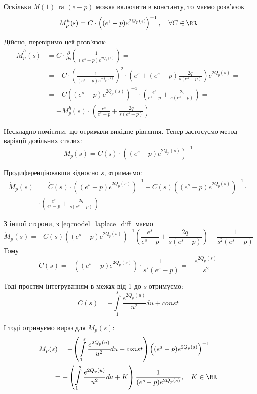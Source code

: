 Оскільки $M(1)$ та $(e-p)$ можна включити в константу, то маємо розв'язок
\begin{equation}
\label{eq:model_laplace_homogen_sol}
M_{p}^{h} (s) = C \cdot \left((e^s - p)  e^{2Q_p(s)}\right)^{-1}, \quad \forall C \in \RR
\end{equation}

Дійсно, перевіримо цей розв'язок:
\[
\begin{split}
\dot M_{p}^{h} (s) &= C \cdot \frac{\partial}{\partial s} \left(\frac{1}{(e^s - p)  e^{2Q_p(s)}}\right)=\\
&= - C \cdot \left(\frac{1}{(e^s - p)  e^{2Q_p(s)}}\right)^2 \cdot \left(e^s  + (e^s - p) \frac{2q}{s(e^s - p)}   \right) e^{2Q_p(s)} =\\
&= -C \left((e^s - p)  e^{2Q_p(s)}\right)^{-1} \cdot \left(\frac{e^s}{e^s - p}  + \frac{2q}{s(e^s - p)}   \right) =\\
&= - M_{p}^{h}(s) \cdot \left(\frac{e^s}{e^s - p}  + \frac{2q}{s(e^s - p)}   \right)
\end{split}
\]

Нескладно помітити, що отримали вихідне рівняння. Тепер застосуємо метод варіації довільних сталих:
$$
M_{p}(s) = C(s) \cdot \left((e^s - p)  e^{2Q_p(s)}\right)^{-1} 
$$

Продиференціювавши відносно $s$, отримаємо:
\begin{align*}
\dot M_{p}(s) &= \dot C(s) \cdot \left((e^s - p)  e^{2Q_p(s)}\right)^{-1} -C(s) \left((e^s - p)  e^{2Q_p(s)}\right)^{-1} \cdot \\
&\cdot \left(\frac{e^s}{e^s - p}  + \frac{2q}{s(e^s - p)}   \right) 
\end{align*}

З іншої сторони, з \eqref{eq:model_laplace_diff} маємо
$$
\dot M_{p}(s) = - C(s) \left((e^s - p)  e^{2Q_p(s)}\right)^{-1}  \left(\frac{e^s}{e^s - p} + \frac{2q}{s(e^s - p)}\right) - \frac{1}{s^2(e^s - p)} \quad	
$$
Тому
$$
\dot C(s) = - \left((e^s - p)  e^{2Q_p(s)}\right) \cdot  \frac{1}{s^2(e^s - p)} =  - \frac{e^{2Q_p(s)}}{s^2}
$$

Тоді простим інтегруванням в межах від 1 до $s$ отримуємо:
\begin{equation}
C(s) = -  \int\limits_1^s \frac{e^{2Q_p(u)}}{u^2} du + const
\end{equation}

І тоді отримуємо вираз для $M_{p}(s)$:
\begin{equation}
\begin{split}
M_{p}(s)=- \left( \int\limits_1^s \frac{e^{2Q_p(u)}}{u^2} du + const \right) \left((e^s - p)  e^{2Q_p(s)}\right)^{-1}  =\\
= - \left( \int\limits_1^s \frac{e^{2Q_p(u)}}{u^2} du + K \right) \frac{1}{(e^s - p)  e^{2Q_p(s)}}, \quad K \in \RR
\end{split}
\end{equation}

